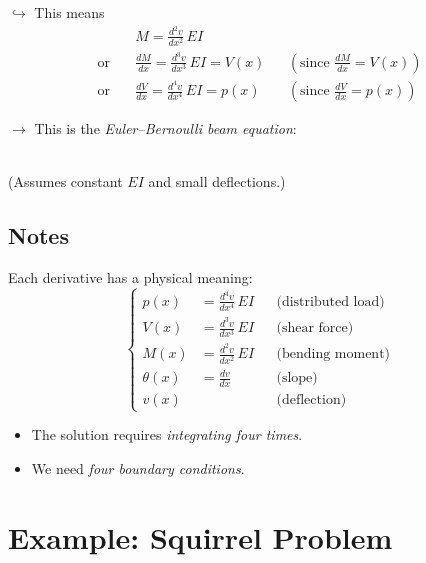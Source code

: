 \documentclass[11pt]{article}
\begin{document}
\noindent
$\hookrightarrow$ This means
\begin{align*}
  & \boxed{M = \frac{d^2 v}{dx^2}\,EI} \\[6pt]
  \text{or} \quad & \frac{dM}{dx} = \frac{d^3 v}{dx^3}\,EI = V(x)
     && \left(\text{since } \frac{dM}{dx} = V(x)\right) \\[6pt]
  \text{or} \quad & \frac{dV}{dx} = \frac{d^4 v}{dx^4}\,EI = p(x)
     && \left(\text{since } \frac{dV}{dx} = p(x)\right)
\end{align*}

\noindent
$\rightarrow$ This is the \emph{Euler--Bernoulli beam equation}:
\begin{center}
\\[0.4em]
(Assumes constant $EI$ and small deflections.)
\end{center}

\subsection*{Notes}

\noindent
Each derivative has a physical meaning:
\[
  \left\{
  \begin{aligned}
    p(x) &= \frac{d^4 v}{dx^4}\,EI && \text{(distributed load)} \\[2pt]
    V(x) &= \frac{d^3 v}{dx^3}\,EI && \text{(shear force)} \\[2pt]
    M(x) &= \frac{d^2 v}{dx^2}\,EI && \text{(bending moment)} \\[2pt]
    \theta(x) &= \frac{dv}{dx} && \text{(slope)} \\[2pt]
    v(x) & && \text{(deflection)}
  \end{aligned}
  \right.
\]

\begin{itemize}[label=\then]
  \item The solution requires \emph{integrating four times}.
  \item We need \emph{four boundary conditions}.
\end{itemize}

\section*{Example: Squirrel Problem}
\end{document}
